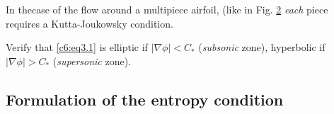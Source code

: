 \begin{figure}[H]
\caption{}\label{c6:fig3.1}
\end{figure}

\begin{figure}[H]
\caption{}\label{c6:fig3.2}
\end{figure}


\begin{remark}\label{c6:rem3.2}%
In the\pageoriginale  case of the flow around a multipiece airfoil,  (like in 
Fig. \ref{c6:fig3.2} \textit{each} piece requires a Kutta-Joukowsky condition.  
\end{remark} 
 
\begin{exercise}\label{c6:exer3.1}%
Verify that \eqref{c6:eq3.1} is elliptic if $| \nabla \phi| < C_* 
$ (\textit{subsonic} zone),  hyperbolic if $| \nabla \phi | > 
C_*$ (\textit{supersonic} zone).    
 \end{exercise} 
 
 \subsection{Formulation of the entropy condition}\label{c6:ss3.3}

